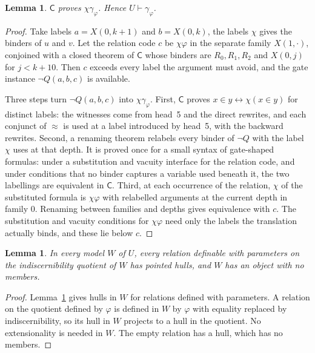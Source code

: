 \documentclass[11pt,letterpaper]{article}
\newtheorem{lemma}[theorem]{Lemma}
\newcommand{\Cc}{\mathsf{C}}
\begin{document}
\begin{lemma}\label{lem:gatesent}
$\Cc$ proves $\chi\gamma_\varphi$. Hence $U\vdash\gamma_\varphi$.
\end{lemma}

\begin{proof}
Take labels $a=X(0,k+1)$ and $b=X(0,k)$, the labels $\chi$ gives the
binders of $u$ and $v$. Let the relation code $c$ be $\chi\varphi$ in the
separate family $X(1,\cdot)$, conjoined with a closed theorem of $\Cc$
whose binders are $R_0,R_1,R_2$ and $X(0,j)$ for $j<k+10$. Then $c$
exceeds every label the argument must avoid, and the gate instance
$\neg Q(a,b,c)$ is available.

Three steps turn $\neg Q(a,b,c)$ into $\chi\gamma_\varphi$.
First, $\Cc$ proves $x\in y\leftrightarrow\chi(x\in y)$ for distinct labels:
the witnesses come from head~5 and the direct rewrites, and each conjunct
of $\approx$ is used at a label introduced by head~5, with the backward
rewrites. Second, a renaming theorem relabels every binder of $\neg Q$
with the label $\chi$ uses at that depth. It is proved once for a small
syntax of gate-shaped formulas: under a substitution and vacuity
interface for the relation code, and under conditions that no binder
captures a variable used beneath it, the two labellings are equivalent in
$\Cc$. Third, at each occurrence of the relation, $\chi$ of the substituted
formula is $\chi\varphi$ with relabelled arguments at the current depth in
family $0$. Renaming between families and depths gives equivalence with
$c$. The substitution and vacuity conditions for $\chi\varphi$ need only the
labels the translation actually binds, and these lie below $c$.
\end{proof}

\begin{lemma}\label{lem:Uhull}
In every model $W$ of $U$, every relation definable with parameters on the
indiscernibility quotient of $W$ has pointed hulls, and $W$ has an object
with no members.
\end{lemma}

\begin{proof}
Lemma~\ref{lem:gatesent} gives hulls in $W$ for relations defined with
parameters. A relation on the quotient defined by $\varphi$ is defined in
$W$ by $\varphi$ with equality replaced by indiscernibility, so its hull in
$W$ projects to a hull in the quotient. No extensionality is needed in $W$.
The empty relation has a hull, which has no members.
\end{proof}
\end{document}
